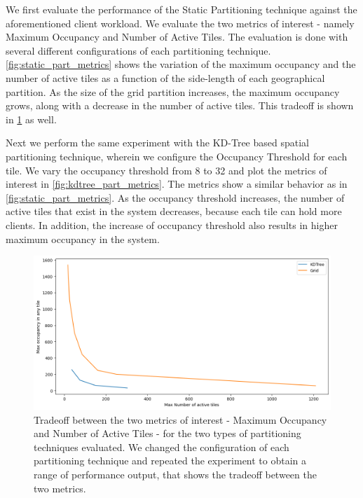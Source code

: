 We first evaluate the performance of the Static Partitioning technique against the aforementioned client workload. We evaluate the two metrics of interest - namely Maximum Occupancy and Number of Active Tiles. The evaluation is done with several different configurations of each partitioning technique. \cref{fig:static_part_metrics} shows the variation of the maximum occupancy and the number of active tiles as a function of the side-length of each geographical partition. As the size of the grid partition increases, the maximum occupancy grows, along with a decrease in the number of active tiles. This tradeoff is shown in \cref{fig:spatial_tradeoff} as well.
\par Next we perform the same experiment with the KD-Tree based spatial partitioning technique, wherein we configure the Occupancy Threshold for each tile. We vary the occupancy threshold from 8 to 32 and plot the metrics of interest in \cref{fig:kdtree_part_metrics}. The metrics show a similar behavior as in \cref{fig:static_part_metrics}. As the occupancy threshold increases, the number of active tiles that exist in the system decreases, because each tile can hold more clients. In addition, the increase of occupancy threshold also results in higher maximum occupancy in the system.

\begin{figure}
\centering
\includegraphics[width=0.75\linewidth]{figures/design_space/spatial/spatial_partitioning_tradeoff.png}
\caption{Tradeoff between the two metrics of interest - Maximum Occupancy and Number of Active Tiles - for the two types of partitioning techniques evaluated. We changed the configuration of each partitioning technique and repeated the experiment to obtain a range of performance output, that shows the tradeoff between the two metrics.}
\label{fig:spatial_tradeoff}
\end{figure}

